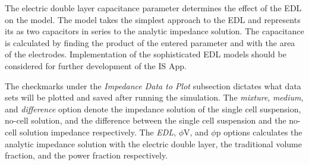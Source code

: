 \par The electric double layer capacitance parameter determines the effect of the EDL on the model. The model takes the simplest approach to the EDL and represents its as two capacitors in series to the analytic impedance solution. The capacitance is calculated by finding the product of the entered parameter and with the area of the electrodes. Implementation of the sophisticated EDL models should be considered for further development of the IS App. 

\par The checkmarks under the \textit{Impedance Data to Plot} subsection dictates what data sets will be plotted and saved after running the simulation. The \textit{mixture}, \textit{medium}, and \textit{difference} option denote the impedance solution of the single cell suspension, no-cell solution, and the difference between the single cell suspension and the no-cell solution impedance respectively. The \textit{EDL}, $\phi$V, and $\phi$p options calculates the analytic impedance solution with the electric double layer, the traditional volume fraction, and the power fraction respectively.

